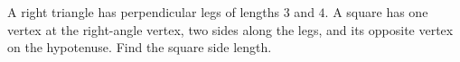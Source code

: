 A right triangle has perpendicular legs of lengths $ 3 $ and $ 4 $. A square has one vertex at the right-angle vertex, two sides along the legs, and its opposite vertex on the hypotenuse. Find the square side length.

